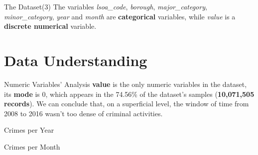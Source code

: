 \documentclass[12pt]{beamer}
\begin{document}
        \begin{frame}{The Dataset(3)}
            The variables \textit{lsoa\_code}, \textit{borough}, \textit{major\_category},
            \textit{minor\_category}, \textit{year} and \textit{month} are \textbf{categorical} variables,
            while \textit{value} is a \textbf{discrete numerical} variable.
        \end{frame}

    \section{Data Understanding} %
    \label{sec:data_understanding}
        \begin{frame}{Numeric Variables' Analysis}
            \textbf{value} is the only numeric variables in the dataset, its \textbf{mode} is 0,
            which appears in the 74.56\% of the dataset's samples (\textbf{10,071,505 records}).
            We can conclude that, on a superficial level, the window of time from 2008 to 2016 wasn't too
            dense of criminal activities.
        \end{frame}

        \begin{frame}{Crimes per Year}
            \begin{figure}
                \centering
            \end{figure}
        \end{frame}

        \begin{frame}{Crimes per Month}
            \begin{figure}
                \centering
            \end{figure}
        \end{frame}
\end{document}
